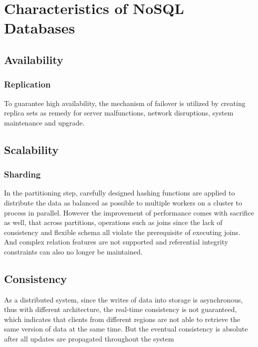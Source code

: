 \[\]
\section{Characteristics of NoSQL Databases}



\subsection{Availability}

\subsubsection{Replication}\mbox{}

To guarantee high availability, the mechanism of failover is utilized by creating replica sets as remedy for server malfunctions, network disruptions, system maintenance and upgrade. 

\subsection{Scalability}


\subsubsection{Sharding}\mbox{}

In the partitioning step, carefully designed hashing functions are applied to distribute the data as balanced as possible to multiple workers on a cluster to process in parallel. However the improvement of performance comes with sacrifice as well, that across partitions, operations such as joins since the lack of consistency and flexible schema all violate the prerequisite of executing joins. And complex relation features are not supported and referential integrity constraints can also no longer be maintained.


\subsection{Consistency}\mbox{}

As a distributed system, since the writes of data into storage is asynchronous, thus with different architecture, the real-time consistency is not guaranteed, which indicates that clients from different regions are not able to retrieve the same version of data at the same time. But the eventual consistency is absolute after all updates are propagated throughout the system 

